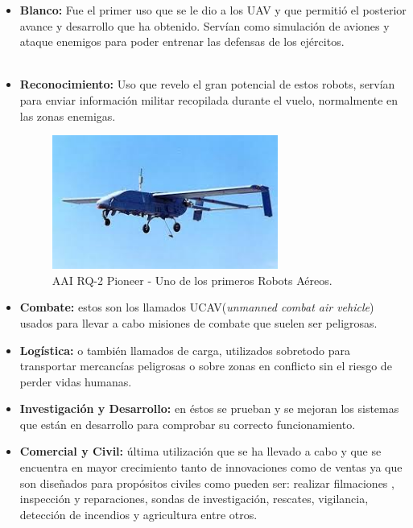\begin{itemize}
		\item \textbf{Blanco:} Fue el primer uso que se le dio a los UAV y que permitió el posterior avance y desarrollo que ha obtenido. Servían como simulación de aviones y ataque enemigos para poder entrenar las defensas de los ejércitos.
		\\
		\\
		\item\textbf{Reconocimiento:} Uso que revelo el gran potencial de estos robots, servían para enviar información militar recopilada durante el vuelo, normalmente en las zonas enemigas. 
	\begin{figure}[H]
		\begin{center}
			\includegraphics[width=0.7\textwidth]{imag/IMG14.jpeg}
					\caption{AAI RQ-2 Pioneer - Uno de los primeros Robots Aéreos.}
		\label{fig:UAV Pioneer.}	
		\end{center}
	\end{figure}		
		
		\item \textbf{Combate:} estos son los llamados UCAV(\textit{unmanned combat air vehicle}) usados para llevar a cabo misiones de combate que suelen ser peligrosas.
		\item \textbf{Logística:} o también llamados de carga, utilizados sobretodo para transportar mercancías peligrosas o sobre zonas en conflicto sin el riesgo de perder vidas humanas.
		\item \textbf{Investigación y Desarrollo:} en éstos se prueban y se mejoran los sistemas que están en desarrollo para comprobar su correcto funcionamiento.
		\item \textbf{Comercial y Civil:} última utilización que se ha llevado a cabo y que se encuentra en mayor crecimiento tanto de innovaciones como de ventas ya que son diseñados para propósitos civiles como pueden ser: realizar filmaciones , inspección y reparaciones, sondas de investigación, rescates, vigilancia, detección de incendios y agricultura entre otros.
\end{itemize}

